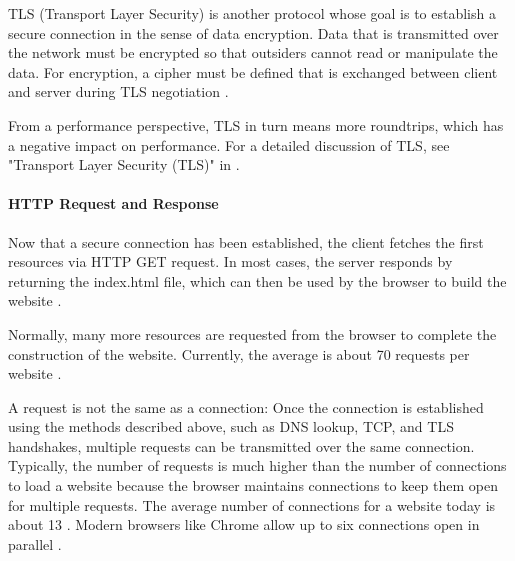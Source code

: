 TLS (Transport Layer Security) is another protocol whose goal is to establish a secure connection in the sense of data encryption.
Data that is transmitted over the network must be encrypted so that outsiders cannot read or manipulate the data.
For encryption, a cipher must be defined that is exchanged between client and server during TLS negotiation \cite{2021MDNHowBrowsersWork}.

From a performance perspective, TLS in turn means more roundtrips, which has a negative impact on performance.
For a detailed discussion of TLS, see "Transport Layer Security (TLS)" in \cite{2013Grigorik}.





\paragraph{HTTP Request and Response} %

Now that a secure connection has been established, the client fetches the first resources via HTTP GET request.
In most cases, the server responds by returning the index.html file, which can then be used by the browser to build the website \cite{2021MDNHowBrowsersWork}.



Normally, many more resources are requested from the browser to complete the construction of the website.
Currently, the average is about 70 requests per website \cite{2021HTTPArchiveStateOfTheWeb}.

A request is not the same as a connection:
Once the connection is established using the methods described above, such as DNS lookup, TCP, and TLS handshakes, multiple requests can be transmitted over the same connection.
Typically, the number of requests is much higher than the number of connections to load a website because the browser maintains connections to keep them open for multiple requests.
The average number of connections for a website today is about 13 \cite{2021HTTPArchiveStateOfTheWeb}.
Modern browsers like Chrome allow up to six connections open in parallel \cite{2014Hogan}. \\


